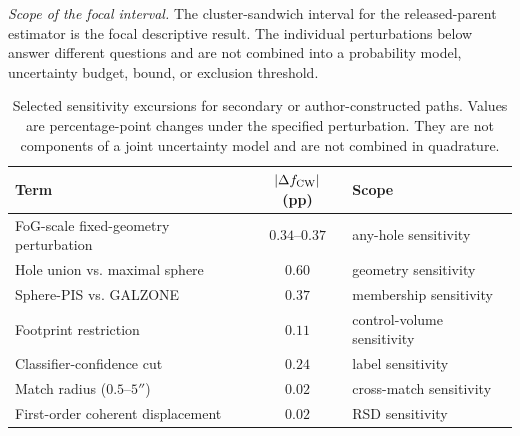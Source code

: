 \documentclass[twocolumn,linenumbers]{aastex702}
\begin{document}
\emph{Scope of the focal interval.} The cluster-sandwich interval for
the released-parent estimator is the focal descriptive result.
The individual perturbations below answer different questions and are
not combined into a probability model, uncertainty budget, bound, or
exclusion threshold.

\begin{table}[ht]
\caption{Selected sensitivity excursions for secondary or
author-constructed paths. Values are percentage-point changes under the
specified perturbation. They are not components of a joint uncertainty
model and are not combined in quadrature.}
\label{tab:systematic_budget}
\begin{ruledtabular}
\begin{tabular}{lcl}
Term & $|\Delta f_{\rm CW}|$ (pp) & Scope \\
\hline
FoG-scale fixed-geometry perturbation & $0.34$--$0.37$ & any-hole sensitivity \\
Hole union vs. maximal sphere & $0.60$ & geometry sensitivity \\
Sphere-PIS vs. GALZONE & $0.37$ & membership sensitivity \\
Footprint restriction & $0.11$ & control-volume sensitivity \\
Classifier-confidence cut & $0.24$ & label sensitivity \\
Match radius ($0.5$--$5''$) & $0.02$ & cross-match sensitivity \\
First-order coherent displacement & $0.02$ & RSD sensitivity \\
\end{tabular}
\end{ruledtabular}
\end{table}
\end{document}
